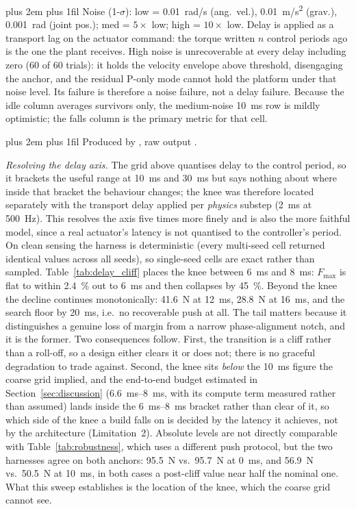 \documentclass[a4paper,fleqn]{cas-dc}
\newcommand{\tabnote}{\par\leftskip=0pt\rightskip=0pt plus 2em%
  \parfillskip=0pt plus 1fil\relax}
\begin{document}
\begin{table}[pos=!tbp]
\begin{tabular}{@{}lccccc@{}}
\bottomrule
\end{tabular}
\vspace{2pt}\tabnote\noindent
Noise (1-$\sigma$): low = \SI{0.01}{rad/s} (ang.\ vel.), \SI{0.01}{m/s^2} (grav.), \SI{0.001}{rad} (joint pos.); med = $5\times$ low; high = $10\times$ low.
Delay is applied as a transport lag on the actuator command: the torque written
$n$ control periods ago is the one the plant receives.
High noise is unrecoverable at every delay including zero (\num{60} of \num{60} trials): it holds the velocity envelope above threshold, disengaging the anchor, and the residual P-only mode cannot hold the platform under that noise level. Its failure is therefore a noise failure, not a delay failure.
Because the idle column averages survivors only, the medium-noise \SI{10}{ms} row is mildly optimistic; the falls column is the primary metric for that cell.
\tabnote\noindent
Produced by ,
raw output .
\end{table}

\emph{Resolving the delay axis.}
The grid above quantises delay to the control period, so it brackets the useful range at \SI{10}{ms} and \SI{30}{ms} but says nothing about where inside that bracket the behaviour changes; the knee was therefore located separately with the transport delay applied per \emph{physics} substep (\SI{2}{ms} at \SI{500}{Hz}). This resolves the axis five times more finely and is also the more faithful model, since a real actuator's latency is not quantised to the controller's period. On clean sensing the harness is deterministic (every multi-seed cell returned identical values across all seeds), so single-seed cells are exact rather than sampled.
Table~\ref{tab:delay_cliff} places the knee between \SI{6}{ms} and \SI{8}{ms}: $F_{\max}$ is flat to within \SI{2.4}{\percent} out to \SI{6}{ms} and then collapses by \SI{45}{\percent}. Beyond the knee the decline continues monotonically: \SI{41.6}{N} at \SI{12}{ms}, \SI{28.8}{N} at \SI{16}{ms}, and the search floor by \SI{20}{ms}, i.e.\ no recoverable push at all. The tail matters because it distinguishes a genuine loss of margin from a narrow phase-alignment notch, and it is the former. Two consequences follow. First, the transition is a cliff rather than a roll-off, so a design either clears it or does not; there is no graceful degradation to trade against. Second, the knee sits \emph{below} the \SI{10}{ms} figure the coarse grid implied, and the end-to-end budget estimated in Section~\ref{sec:discussion} (\SIrange{6.6}{8}{ms}, with its compute term measured rather than assumed) lands inside the \SIrange{6}{8}{ms} bracket rather than clear of it, so which side of the knee a build falls on is decided by the latency it achieves, not by the architecture (Limitation~2).
Absolute levels are not directly comparable with Table~\ref{tab:robustness}, which uses a different push protocol, but the two harnesses agree on both anchors: \SI{95.5}{N} vs.\ \SI{95.7}{N} at \SI{0}{ms}, and \SI{56.9}{N} vs.\ \SI{50.5}{N} at \SI{10}{ms}, in both cases a post-cliff value near half the nominal one. What this sweep establishes is the location of the knee, which the coarse grid cannot see.
\end{document}
